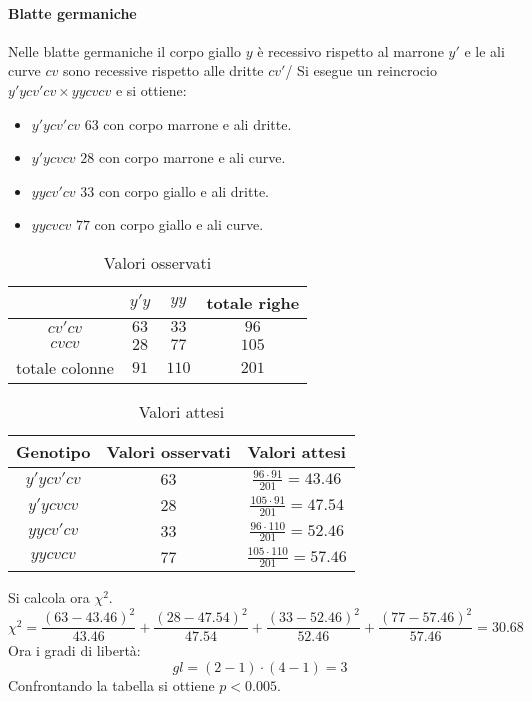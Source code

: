			\paragraph{Blatte germaniche}
			Nelle blatte germaniche il corpo giallo $y$ \`e recessivo rispetto al marrone $y'$ e le ali curve $cv$ sono recessive rispetto alle dritte $cv'$/
			Si esegue un reincrocio $y'ycv'cv\times yycvcv$ e si ottiene:
			\begin{multicols}{2}
				\begin{itemize}
					\item $y'ycv'cv$ $63$ con corpo marrone e ali dritte.
					\item $y'ycvcv$ $28$ con corpo marrone e ali curve.
					\item $yycv'cv$ $33$ con corpo giallo e ali dritte.
					\item $yycvcv$ $77$ con corpo giallo e ali curve.
				\end{itemize}
			\end{multicols}
			\begin{multicols}{2}
				\begin{table}[H]
					\centering
					\begin{tabular}{|c|c|c|c|}
						\hline
					 		& $y'y$ & $yy$ & totale righe\\
						\hline
						$cv'cv$ & $63$ & $33$ & $96$\\
						\hline
						$cvcv$  & $28$ & $77$ & $105$\\
						\hline
						totale colonne & $91$ & $110$ & $201$\\
						\hline
					\end{tabular}
					\caption{Valori osservati}
				\end{table}
	
				\begin{table}[H]
					\centering
					\begin{tabular}{|c|c|c|}
						\hline
						Genotipo & Valori osservati & Valori attesi\\
						\hline
						$y'ycv'cv$ & $63$ & $\frac{96\cdot 91}{201} = 43.46$\\
						\hline
						$y'ycvcv$ & $28$ & $\frac{105\cdot 91}{201} = 47.54$\\
						\hline
						$yycv'cv$ & $33$ & $\frac{96\cdot 110}{201} = 52.46$\\
						\hline
						$yycvcv$ & $77$ & $\frac{105\cdot 110}{201} = 57.46$\\
						\hline
					\end{tabular}
					\caption{Valori attesi}
				\end{table}
			\end{multicols}
			Si calcola ora $\chi^2$.
			\[\chi^2 = \dfrac{(63-43.46)^2}{43.46} + \dfrac{(28-47.54)^2}{47.54} + \dfrac{(33-52.46)^2}{52.46} + \dfrac{(77-57.46)^2}{57.46} = 30.68\]
			Ora i gradi di libert\`a:
			\[gl = (2 - 1)\cdot(4 - 1) = 3\]
			Confrontando la tabella si ottiene $p<0.005$.

